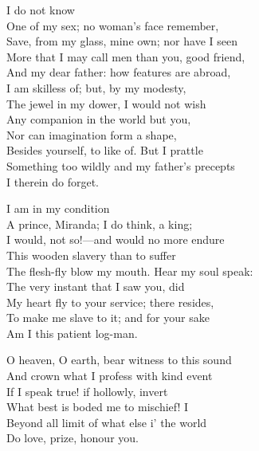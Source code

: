 \begin{verse_speech}[Miranda] 
I do not know\\
One of my sex; no woman's face remember,\\
Save, from my glass, mine own; nor have I seen\\
More that I may call men than you, good friend,\\
And my dear father: how features are abroad,\\
I am skilless of; but, by my modesty,\\
The jewel in my dower, I would not wish\\
Any companion in the world but you,\\
Nor can imagination form a shape,\\
Besides yourself, to like of. But I prattle\\
Something too wildly and my father's precepts\\
I therein do forget.
\end{verse_speech}

\begin{verse_speech}[Ferdinand] 
I am in my condition\\
A prince, Miranda; I do think, a king;\\
I would, not so!—and would no more endure\\
This wooden slavery than to suffer\\
The flesh-fly blow my mouth. Hear my soul speak:\\
The very instant that I saw you, did\\
My heart fly to your service; there resides,\\
To make me slave to it; and for your sake\\
Am I this patient log-man.
\end{verse_speech}


\begin{verse_speech}[Ferdinand] 
O heaven, O earth, bear witness to this sound\\
And crown what I profess with kind event\\
If I speak true! if hollowly, invert\\
What best is boded me to mischief! I\\
Beyond all limit of what else i' the world\\
Do love, prize, honour you.
\end{verse_speech}


